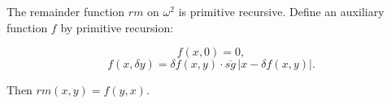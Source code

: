 The remainder function $rm$ on $\omega^2$ is primitive recursive. Define an auxiliary function $f$ by primitive recursion:

$$f(x, 0) = 0,$$
$$f(x, \delta y) = \delta f(x, y) \cdot \overline{sg}\,|x - \delta f(x, y)|.$$

Then $rm(x, y) = f(y, x)$.

